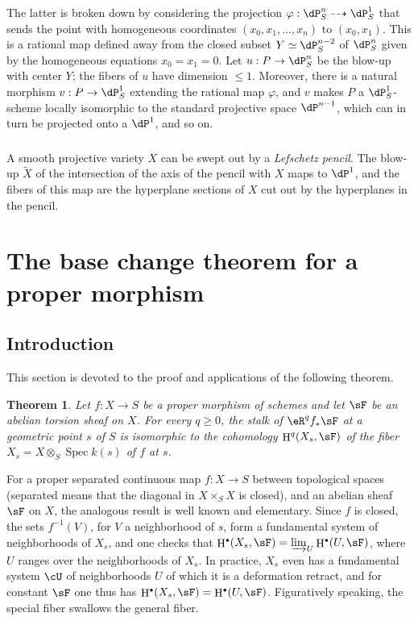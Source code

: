 \documentclass[12pt,oneside,english]{smfbook}
\DeclareMathOperator{\h}{H}
\DeclareMathOperator{\spec}{Spec}
\newtheorem{theorem}[subsubsection]{Theorem}
\let\oldbullet\bullet
\renewcommand{\bullet}{\textnormal{\tiny$\oldbullet$}}
\begin{document}
The latter is broken down by considering the projection $\varphi:\dP_S^n\dashrightarrow\dP_S^1$ that sends the point with homogeneous coordinates $(x_0,x_1,\dotsc,x_n)$ to $(x_0,x_1)$. This is a rational map defined away from the closed subset $Y\simeq\dP_S^{n-2}$ of $\dP_S^n$ given by the homogeneous equations $x_0=x_1=0$. Let $u:P\to\dP_S^n$ be the blow-up with center $Y$; the fibers of $u$ have dimension $\leqslant1$. Moreover, there is a natural morphism $v:P\to\dP_S^1$ extending the rational map $\varphi$, and $v$ makes $P$ a $\dP_S^1$-scheme locally isomorphic to the standard projective space $\dP^{n-1}$, which can in turn be projected onto a $\dP^1$, and so on.

\subsubsection{}\label{I:3-4-4}

A smooth projective variety $X$ can be swept out by a \emph{Lefschetz pencil}. The blow-up $\widetilde X$ of the intersection of the axis of the pencil with $X$ maps to $\dP^1$, and the fibers of this map are the hyperplane sections of $X$ cut out by the hyperplanes in the pencil.

\section{The base change theorem for a proper morphism}\label{I:4}

\subsection{Introduction}\label{I:4-1}

This section is devoted to the proof and applications of the following theorem.

\begin{theorem}\label{I:4-1-1}
Let $f:X\to S$ be a proper morphism of schemes and let $\sF$ be an abelian torsion sheaf on $X$. For every $q\geqslant0$, the stalk of $\eR^qf_*\sF$ at a geometric point $s$ of $S$ is isomorphic to the cohomology $\h^q(X_s,\sF)$ of the fiber $X_s=X\otimes_S\spec k(s)$ of $f$ at $s$.
\end{theorem}

For a proper separated continuous map $f:X\to S$ between topological spaces (separated means that the diagonal in $X\times_SX$ is closed), and an abelian sheaf $\sF$ on $X$, the analogous result is well known and elementary. Since $f$ is closed, the sets $f^{-1}(V)$, for $V$ a neighborhood of $s$, form a fundamental system of neighborhoods of $X_s$, and one checks that $\h^\bullet(X_s,\sF)=\varinjlim_U\h^\bullet(U,\sF)$, where $U$ ranges over the neighborhoods of $X_s$. In practice, $X_s$ even has a fundamental system $\cU$ of neighborhoods $U$ of which it is a deformation retract, and for constant $\sF$ one thus has $\h^\bullet(X_s,\sF)=\h^\bullet(U,\sF)$. Figuratively speaking, the special fiber swallows the general fiber.
\end{document}
